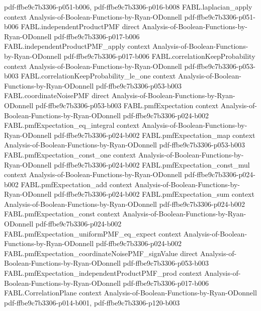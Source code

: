 \begin{theorem}
  {pdf-ffbe9c7b3306-p051-b006,
    pdf-ffbe9c7b3306-p016-b008}
\proofstep
  {FABL.laplacian_apply}
  {context}
  {Analysis-of-Boolean-Functions-by-Ryan-ODonnell}
  {pdf-ffbe9c7b3306-p051-b006}
\proofstep
  {FABL.independentProductPMF}
  {direct}
  {Analysis-of-Boolean-Functions-by-Ryan-ODonnell}
  {pdf-ffbe9c7b3306-p017-b006}
\proofstep
  {FABL.independentProductPMF_apply}
  {context}
  {Analysis-of-Boolean-Functions-by-Ryan-ODonnell}
  {pdf-ffbe9c7b3306-p017-b006}
\proofstep
  {FABL.correlationKeepProbability}
  {context}
  {Analysis-of-Boolean-Functions-by-Ryan-ODonnell}
  {pdf-ffbe9c7b3306-p053-b003}
\proofstep
  {FABL.correlationKeepProbability_le_one}
  {context}
  {Analysis-of-Boolean-Functions-by-Ryan-ODonnell}
  {pdf-ffbe9c7b3306-p053-b003}
\proofstep
  {FABL.coordinateNoisePMF}
  {direct}
  {Analysis-of-Boolean-Functions-by-Ryan-ODonnell}
  {pdf-ffbe9c7b3306-p053-b003}
\proofstep
  {FABL.pmfExpectation}
  {context}
  {Analysis-of-Boolean-Functions-by-Ryan-ODonnell}
  {pdf-ffbe9c7b3306-p024-b002}
\proofstep
  {FABL.pmfExpectation_eq_integral}
  {context}
  {Analysis-of-Boolean-Functions-by-Ryan-ODonnell}
  {pdf-ffbe9c7b3306-p024-b002}
\proofstep
  {FABL.pmfExpectation_map}
  {context}
  {Analysis-of-Boolean-Functions-by-Ryan-ODonnell}
  {pdf-ffbe9c7b3306-p053-b003}
\proofstep
  {FABL.pmfExpectation_const_one}
  {context}
  {Analysis-of-Boolean-Functions-by-Ryan-ODonnell}
  {pdf-ffbe9c7b3306-p024-b002}
\proofstep
  {FABL.pmfExpectation_const_mul}
  {context}
  {Analysis-of-Boolean-Functions-by-Ryan-ODonnell}
  {pdf-ffbe9c7b3306-p024-b002}
\proofstep
  {FABL.pmfExpectation_add}
  {context}
  {Analysis-of-Boolean-Functions-by-Ryan-ODonnell}
  {pdf-ffbe9c7b3306-p024-b002}
\proofstep
  {FABL.pmfExpectation_sum}
  {context}
  {Analysis-of-Boolean-Functions-by-Ryan-ODonnell}
  {pdf-ffbe9c7b3306-p024-b002}
\proofstep
  {FABL.pmfExpectation_const}
  {context}
  {Analysis-of-Boolean-Functions-by-Ryan-ODonnell}
  {pdf-ffbe9c7b3306-p024-b002}
\proofstep
  {FABL.pmfExpectation_uniformPMF_eq_expect}
  {context}
  {Analysis-of-Boolean-Functions-by-Ryan-ODonnell}
  {pdf-ffbe9c7b3306-p024-b002}
\proofstep
  {FABL.pmfExpectation_coordinateNoisePMF_signValue}
  {direct}
  {Analysis-of-Boolean-Functions-by-Ryan-ODonnell}
  {pdf-ffbe9c7b3306-p053-b003}
\proofstep
  {FABL.pmfExpectation_independentProductPMF_prod}
  {context}
  {Analysis-of-Boolean-Functions-by-Ryan-ODonnell}
  {pdf-ffbe9c7b3306-p017-b006}
\proofstep
  {FABL.CorrelationPlane}
  {context}
  {Analysis-of-Boolean-Functions-by-Ryan-ODonnell}
  {pdf-ffbe9c7b3306-p014-b001,
    pdf-ffbe9c7b3306-p120-b003}
\proofstep

\end{theorem}

